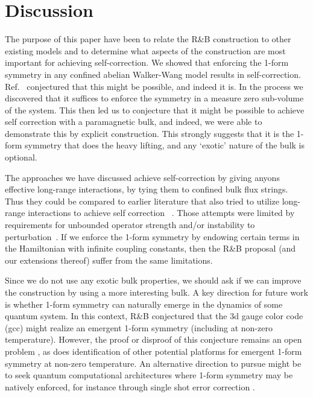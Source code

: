 \section{Discussion}

The  purpose of this paper have been to relate the R\&B construction to other existing models and to determine what aspects of the construction are most important for achieving self-correction. We showed that enforcing the 1-form symmetry in any confined abelian Walker-Wang model results in self-correction. Ref.~\cite{RobertsBartlett2020} conjectured that this might be possible, and indeed it is. In the process we discovered that it suffices to enforce the symmetry in a measure zero sub-volume of the system. This then led us to conjecture that it might be possible to achieve self correction with a paramagnetic bulk, and indeed, we were able to demonstrate this by explicit construction. This strongly suggests that it is the 1-form symmetry that does the heavy lifting, and any `exotic' nature of the bulk is optional. 

The approaches we have discussed achieve self-correction by giving anyons effective long-range interactions, by tying them to confined bulk flux strings. Thus they could be compared to earlier literature that also tried to utilize long-range interactions to achieve self correction ~\cite{Hamma2009Toric, Chesi2010Self, Pedrocchi2011Memory, Hutter2012Self, Wootton2013Topological, Becker2013Dynamic, Pedrocchi2013Thermal, Hutter2014Effective}.
Those attempts were limited by requirements for unbounded operator strength and/or instability to perturbation~\cite{Brown2016Finite, LandonCardinal2015}. If we enforce the 1-form symmetry by endowing certain terms in the Hamiltonian with infinite coupling constants, then the R\&B proposal (and our extensions thereof) suffer from the same limitations. 

Since we do not use any exotic bulk properties, we should ask if we can improve the construction by using a more interesting bulk.
A key direction for future work is  whether 1-form symmetry can naturally emerge in the dynamics of some quantum system. In this context, R\&B conjectured that the 3d gauge color code~\cite{Bombin2015Gauge} (gcc) might realize an emergent 1-form symmetry (including at non-zero temperature). However, the proof or disproof of this conjecture remains an open problem \cite{Kubica2018Ungauging}, as does identification of other potential platforms for emergent 1-form symmetry at non-zero temperature. An alternative direction to pursue might be to seek quantum computational architectures where 1-form symmetry may be natively enforced, for instance through single shot error correction \cite{Roberts2017SPTO, Bombin2015SingleShot}. 

